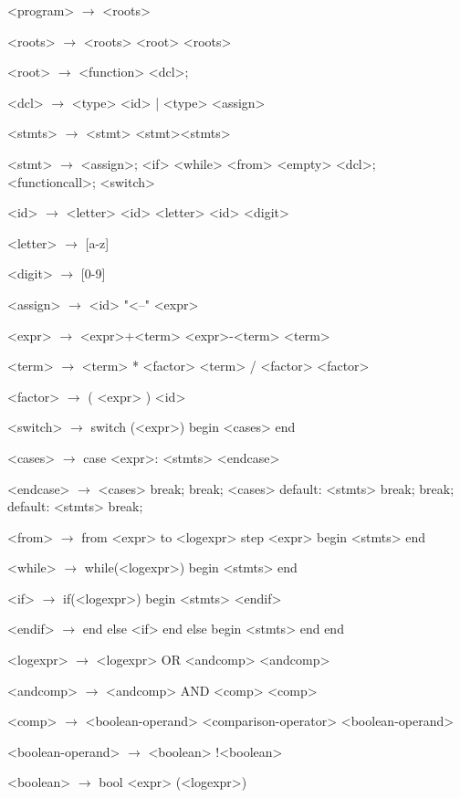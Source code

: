 \documentclass{article}
\begin{document}
\begin{grammar}
<program> $\rightarrow$ <roots>

<roots> $\rightarrow$ <roots>
\alt <root> <roots>

<root> $\rightarrow$ <function>
\alt <dcl>;

<dcl> $\rightarrow$ <type> <id>
| <type> <assign>

<stmts> $\rightarrow$ <stmt>
	\alt <stmt><stmts>

<stmt> $\rightarrow$ <assign>;
	\alt <if>
	\alt <while>
	\alt <from>
	\alt <empty>
	\alt <dcl>;
	\alt <functioncall>;
	\alt <switch>

<id> $\rightarrow$ <letter>
	\alt<id> <letter>
	\alt<id> <digit>

<letter> $\rightarrow$ [a-z]
	\alt [A-Z]

<digit> $\rightarrow$ [0-9]

<assign>  $\rightarrow$ <id> "<--" <expr>

<expr> $\rightarrow$ <expr>+<term>
	\alt<expr>-<term>
	\alt<term>

<term> $\rightarrow$ <term> * <factor>
	\alt <term> / <factor>
	\alt <factor>

<factor> $\rightarrow$ ( <expr> )
	\alt <id>

<switch> $\rightarrow$ switch (<expr>)
		begin
			<cases>
		end

<cases> $\rightarrow$ case <expr>:
			<stmts>
		<endcase>
		
<endcase> $\rightarrow$ <cases>
		\alt break;
		\alt break;
		<cases>
		\alt default:
			<stmts>
			break;
		\alt break;
		default:
			<stmts>
			break;

<from> $\rightarrow$ from <expr> to <logexpr> step <expr>
	begin
		<stmts>
	end 

<while> $\rightarrow$ while(<logexpr>)
		begin
			<stmts>
		end

<if> $\rightarrow$ if(<logexpr>)
	begin
		<stmts>
	<endif>

<endif> $\rightarrow$ end
	else <if>
	\alt end
	else
	begin
		<stmts>
	end
	\alt end

<logexpr> $\rightarrow$ <logexpr> OR <andcomp>
		\alt <andcomp>

<andcomp> $\rightarrow$ <andcomp> AND <comp>

<comp> $\rightarrow$ <boolean-operand> <comparison-operator> <boolean-operand>

<boolean-operand> $\rightarrow$ <boolean>
		\alt !<boolean>

<boolean> $\rightarrow$ bool
		\alt (<logexpr>)


\end{grammar}
\end{document}
